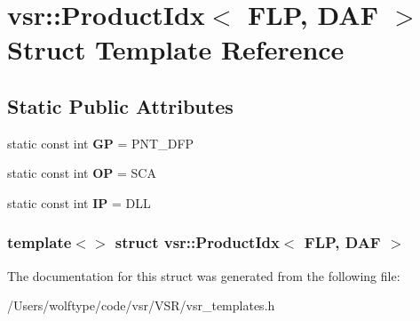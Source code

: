 \hypertarget{structvsr_1_1_product_idx_3_01_f_l_p_00_01_d_a_f_01_4}{\section{vsr\-:\-:Product\-Idx$<$ F\-L\-P, D\-A\-F $>$ Struct Template Reference}
\label{structvsr_1_1_product_idx_3_01_f_l_p_00_01_d_a_f_01_4}
}
\subsection*{Static Public Attributes}
\begin{DoxyCompactItemize}
\item 
\hypertarget{structvsr_1_1_product_idx_3_01_f_l_p_00_01_d_a_f_01_4_a4edf98837326ae51be3a7d0c88044b48}{static const int {\bfseries G\-P} = P\-N\-T\-\_\-\-D\-F\-P}\label{structvsr_1_1_product_idx_3_01_f_l_p_00_01_d_a_f_01_4_a4edf98837326ae51be3a7d0c88044b48}

\item 
\hypertarget{structvsr_1_1_product_idx_3_01_f_l_p_00_01_d_a_f_01_4_aee3ede8ddaec38aba86a64a6e93d5f67}{static const int {\bfseries O\-P} = S\-C\-A}\label{structvsr_1_1_product_idx_3_01_f_l_p_00_01_d_a_f_01_4_aee3ede8ddaec38aba86a64a6e93d5f67}

\item 
\hypertarget{structvsr_1_1_product_idx_3_01_f_l_p_00_01_d_a_f_01_4_ad212e0844c487f42b4df5a456c5a8d0a}{static const int {\bfseries I\-P} = D\-L\-L}\label{structvsr_1_1_product_idx_3_01_f_l_p_00_01_d_a_f_01_4_ad212e0844c487f42b4df5a456c5a8d0a}

\end{DoxyCompactItemize}
\subsubsection*{template$<$$>$ struct vsr\-::\-Product\-Idx$<$ F\-L\-P, D\-A\-F $>$}



The documentation for this struct was generated from the following file\-:\begin{DoxyCompactItemize}
\item 
/\-Users/wolftype/code/vsr/\-V\-S\-R/vsr\-\_\-templates.\-h\end{DoxyCompactItemize}
